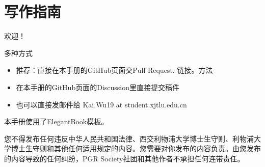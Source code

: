 \chapter{写作指南}

欢迎！

多种方式
\begin{itemize}
    \item 推荐：直接在本手册的GitHub页面交Pull Request. 链接。方法
    \item 在本手册的GitHub页面的Discussion里直接提交稿件
    \item 也可以直接发邮件给 Kai.Wu19 at student.xjtlu.edu.cn
\end{itemize}
本手册使用了ElegantBook模板。

您不得发布任何违反中华人民共和国法律、西交利物浦大学博士生守则、利物浦大学博士生守则和其他任何适用规定的内容。您需要对你发布的内容负责。由您发布的内容导致的任何纠纷，PGR Society社团和其他作者不承担任何连带责任。
